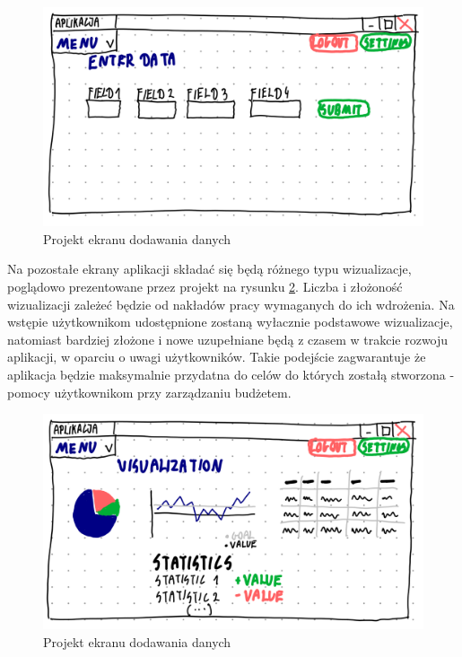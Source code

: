 \documentclass[a4paper,10pt, twoside]{report}
\begin{document}
\begin{large}
\begin{figure}[H]           %
    \centering
    \includegraphics[width=12cm]{figures/Righten_UI_sketch_adddata.png}
    \caption{Projekt ekranu dodawania danych}
    \label{fig:uiprojectadddata}
\end{figure}

{Na pozostałe ekrany aplikacji składać się będą różnego typu wizualizacje, 
poglądowo prezentowane przez projekt na rysunku 
\ref*{fig:uiprojectvisualizations}. Liczba i złożoność wizualizacji zależeć 
będzie od nakładów pracy wymaganych do ich wdrożenia. Na wstępie użytkownikom 
udostępnione zostaną wyłacznie podstawowe wizualizacje, natomiast bardziej 
złożone i nowe uzupełniane będą z czasem w trakcie rozwoju aplikacji, w oparciu 
o uwagi użytkowników. Takie podejście zagwarantuje że aplikacja będzie 
maksymalnie przydatna do celów do których zostałą stworzona - pomocy 
użytkownikom przy zarządzaniu budżetem.}

\begin{figure}[H]           %
    \centering
    \includegraphics[width=12cm]{figures/Righten_UI_sketch_viusalizations.png}
    \caption{Projekt ekranu dodawania danych}
    \label{fig:uiprojectvisualizations}
\end{figure}


\end{large}
\end{document}
